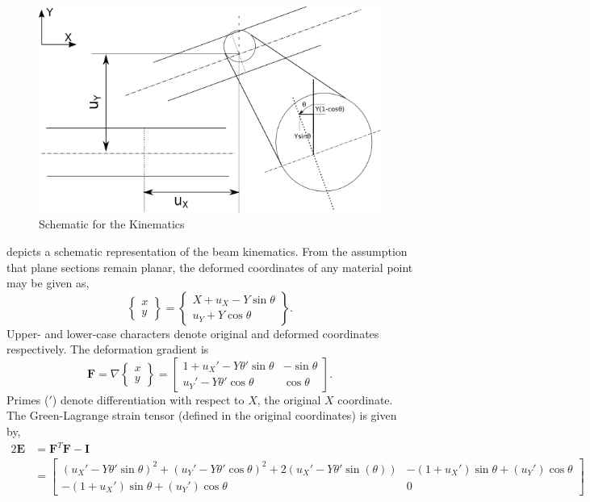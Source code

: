 \documentclass[10pt]{article}
\begin{document}
\begin{figure}[!h]
  \centering
  \includegraphics[width=0.6\linewidth]{FIGS/schem}
  \caption{Schematic for the Kinematics}
  \label{fig:schem}
\end{figure}
 depicts a schematic representation of the beam
kinematics. From the assumption that plane sections remain planar, the
deformed coordinates of any material point may be given as,
\begin{equation}
  \begin{Bmatrix}
    x\\ y
  \end{Bmatrix} =
  \begin{Bmatrix}
    X + u_X - Y\sin\theta\\
    u_Y + Y\cos\theta
  \end{Bmatrix}.
  \label{eq:def}
\end{equation}
Upper- and lower-case characters denote original and deformed
coordinates respectively. The deformation gradient is
\begin{equation}
  \bm{F} = \nabla
  \begin{Bmatrix}
    x\\y
  \end{Bmatrix} =
  \begin{bmatrix}
    1+u_X'-Y\theta'\sin\theta & -\sin\theta\\
    u_Y'-Y\theta'\cos\theta & \cos\theta
  \end{bmatrix}.
  \label{eq:defgrad}
\end{equation}
Primes ($'$) denote differentiation with respect to $X$, the original
$X$ coordinate. The Green-Lagrange strain tensor (defined in the
original coordinates) is given by,
\begin{align}
  2\bm{E} &= \bm{F}^T\bm{F} - \bm{I}\nonumber\\
  &=
    \begin{bmatrix}
      {(u_X'-Y\theta'\sin\theta)}^2+{(u_Y'-Y\theta'\cos\theta)}^2+2(u_X'-Y\theta'\sin(\theta))
      & -(1+u_X')\sin\theta+(u_Y')\cos\theta\\
      -(1+u_X')\sin\theta+(u_Y')\cos\theta & 0
    \end{bmatrix}
  \label{eq:strain}
\end{align}
\end{document}
